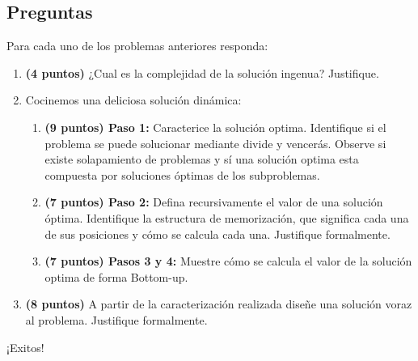 \documentclass[10pt,twocolumn]{article}
\begin{document}
\subsection{Preguntas}

Para cada uno de los problemas anteriores responda:

\begin{enumerate}
	\item \textbf{(4 puntos)} ¿Cual es la complejidad de la solución ingenua? Justifique.
	\newpage
	\item Cocinemos una deliciosa solución dinámica:
	\begin{enumerate}
		\item \textbf{(9 puntos) Paso 1:} Caracterice la solución optima. Identifique si el problema se puede solucionar mediante divide y vencerás. Observe si existe solapamiento de problemas y sí una solución optima esta compuesta por soluciones óptimas de los subproblemas.
		\item \textbf{(7 puntos) Paso 2:} Defina recursivamente el valor de una solución óptima. Identifique la estructura de memorización, que significa cada una de sus posiciones y cómo se calcula cada una. Justifique formalmente.
		\item \textbf{(7 puntos) Pasos 3 y 4:} Muestre cómo se calcula el valor de la solución optima de forma Bottom-up.
	\end{enumerate}
	\item \textbf{(8 puntos)} A partir de la caracterización realizada diseñe una solución voraz al problema. Justifique formalmente.
\end{enumerate}

\begin{center}
	\huge{¡Exitos!}
\end{center}
\end{document}
